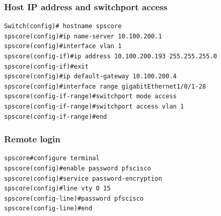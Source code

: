 \documentclass[a4paper,notitlepage]{article}
\begin{document}
\subsubsection{Host IP address and switchport access}

\begin{verbatim}
Switch(config)# hostname spscore
spscore(config)#ip name-server 10.100.200.1
spscore(config)#interface vlan 1
spscore(config-if)#ip address 10.100.200.193 255.255.255.0
spscore(config-if)#exit
spscore(config)#ip default-gateway 10.100.200.4
spscore(config)#interface range gigabitEthernet1/0/1-28
spscore(config-if-range)#switchport mode access 
spscore(config-if-range)#switchport access vlan 1
spscore(config-if-range)#end
\end{verbatim}

\subsubsection{Remote login}

\begin{verbatim}
spscore#configure terminal
spscore(config)#enable password pfscisco
spscore(config)#service password-encryption 
spscore(config)#line vty 0 15
spscore(config-line)#password pfscisco
spscore(config-line)#end
\end{verbatim}
\end{document}
